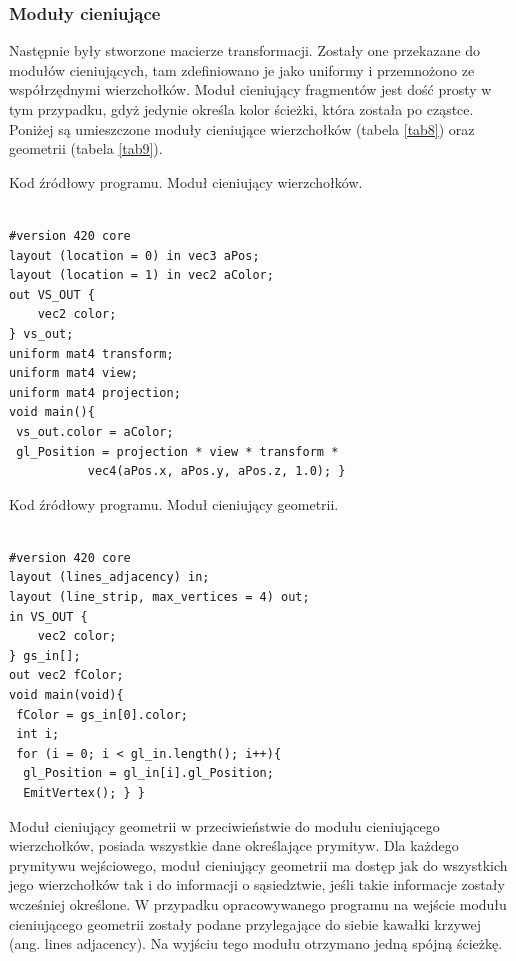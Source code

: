 \subsubsection{Moduły cieniujące}
Następnie były stworzone macierze transformacji. Zostały one przekazane do modułów cieniujących, tam zdefiniowano je jako uniformy i przemnożono ze współrzędnymi wierzchołków. Moduł cieniujący fragmentów jest dość prosty w tym przypadku, gdyż jedynie określa kolor ścieżki, która została po cząstce. Poniżej są umieszczone moduły cieniujące wierzchołków (tabela \ref{tab8}) oraz geometrii (tabela \ref{tab9}).
\begin{table}[H]
\caption{Kod źródłowy programu. Moduł cieniujący wierzchołków.}
\label{tab8}
\begin{lstlisting}[frame=single]  % Start your code-block

#version 420 core
layout (location = 0) in vec3 aPos;
layout (location = 1) in vec2 aColor;
out VS_OUT {
    vec2 color;
} vs_out;
uniform mat4 transform;
uniform mat4 view;
uniform mat4 projection;
void main(){
 vs_out.color = aColor;
 gl_Position = projection * view * transform * 
           vec4(aPos.x, aPos.y, aPos.z, 1.0); }
\end{lstlisting}
\end{table}
\begin{table}[H]
\caption{Kod źródłowy programu. Moduł cieniujący geometrii.}
\label{tab9}
\begin{lstlisting}[frame=single]  % Start your code-block

#version 420 core
layout (lines_adjacency) in;
layout (line_strip, max_vertices = 4) out;
in VS_OUT {
    vec2 color;
} gs_in[];
out vec2 fColor;
void main(void){
 fColor = gs_in[0].color;
 int i;
 for (i = 0; i < gl_in.length(); i++){
  gl_Position = gl_in[i].gl_Position;
  EmitVertex(); } }
\end{lstlisting}
\end{table}

Moduł cieniujący geometrii w przeciwieństwie do modułu cieniującego wierzchołków, posiada wszystkie dane określające prymityw. Dla każdego prymitywu wejściowego, moduł cieniujący geometrii ma dostęp jak do wszystkich jego wierzchołków tak i do informacji o sąsiedztwie, jeśli takie informacje zostały wcześniej określone. W przypadku opracowywanego programu na wejście modułu cieniującego geometrii zostały podane przylegające do siebie kawałki krzywej (ang. lines adjacency). Na wyjściu tego modułu otrzymano jedną spójną ścieżkę.


